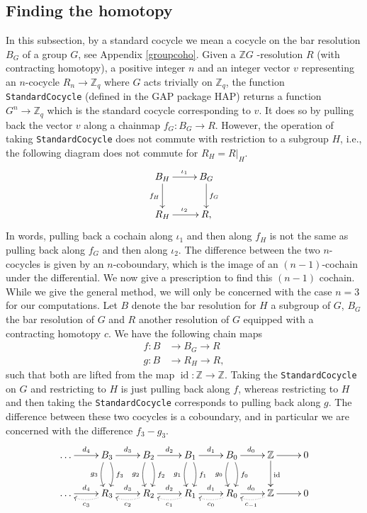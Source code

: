 \documentclass[a4paper, 10pt]{book}
\theoremstyle{definition}
\numberwithin{equation}{chapter}
\newcommand\lstl{\lstinline}
\newcommand\id{\operatorname{id}}
\newcommand\ZZ{\mathbb Z}
\newcommand{\ra}\rightarrow
\begin{document}
\subsection{Finding the homotopy}
In this subsection, by a standard cocycle we mean a cocycle on the bar resolution $B_G$ of a group $G$, see Appendix \ref{groupcoho}. Given a $\ZZ G$ -resolution $R$ (with contracting homotopy), a positive integer $n$ and an integer vector $v$ representing an $n$-cocycle $R_n \ra \ZZ_q$ where $G$ acts trivially on $\ZZ_q$, the function \lstl{StandardCocycle} (defined in the GAP package HAP) returns a function $G^n\ra \ZZ_q$ which is the standard cocycle corresponding to $v$. It does so by pulling back the vector $v$ along a chainmap $f_G: B_G \ra R$.  However, the operation of taking \lstl{StandardCocycle} does not commute with restriction to a subgroup $H$, i.e., the following diagram does not commute for $R_H = R|_H$. \[
\xymatrix{B_H\ar[r]^{\iota_1}\ar[d]_{f_H} & B_G\ar[d]^{f_G}\\
R_H\ar[r]^{\iota_2} & R,}
\] In words, pulling back a cochain along $\iota_1$ and then along $f_H$ is not the same as pulling back along $f_G$ and then along $\iota_2$. 	The difference between the two $n$-cocycles is given by an $n$-coboundary, which is the image of an $(n-1)$-cochain under the differential. We now give a prescription to find this $(n-1)$ cochain. While we give the general method, we will only be concerned with the case $n=3$ for our computations.
Let $B$ denote the bar resolution for $H$ a subgroup of $G$, $B_G$ the bar resolution of $G$ and $R$ another resolution of $G$ equipped with a contracting homotopy $c$. We have the following chain maps \begin{align}
	f:B &\ra B_G \ra R \\
	g: B &\ra R_H \ra R,
\end{align} 
such that both are lifted from the map $\id: \ZZ \ra \ZZ$. Taking the \lstl{StandardCocycle} on $G$ and restricting to $H$ is just pulling back along $f$, whereas restricting to $H$ and then taking the \lstl{StandardCocycle} corresponds to pulling back along $g$. The difference between these two cocycles is a coboundary, and in particular we are concerned with the difference $f_3 - g_3$.
\[
\xymatrix{ \dots \ar[r]^{d_4}  & B_3 \ar[r]^{d_3} \ar@/^/[d]^{f_3}\ar@/_/[d]_{g_3} & B_2 \ar[r]^{d_2}\ar@/^/[d]^{f_2}\ar@/_/[d]_{g_2} & \ar[r]^{d_1} B_1 \ar@/^/[d]^{f_1}\ar@/_/[d]_{g_1} & \ar[r]^{d_0} B_0 \ar@/^/[d]^{f_0}\ar@/_/[d]_{g_0} & \ZZ\ar[r] \ar[d]^{\id}&  0 \\
 \dots \ar[r]^{d_4} & R_3 \ar[r]^{d_3} \ar@{.>}@/^/[l]^{c_3} & R_2 \ar[r]^{d_2} \ar@{.>}@/^/[l]^{c_2}& R_1 \ar[r]^{d_1} \ar@{.>}@/^/[l]^{c_1} & R_0 \ar[r]^{d_0}  \ar@{.>}@/^/[l]^{c_0}& \ZZ \ar[r] \ar@{.>}@/^/[l]^{c_{-1}}& 0
}
\]
\end{document}
